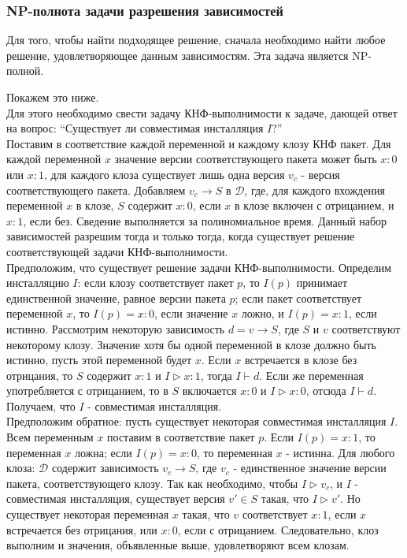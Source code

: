 \subsubsection{NP-полнота задачи разрешения зависимостей}
Для того, чтобы найти подходящее решение, сначала необходимо найти любое
решение, удовлетворяющее данным зависимостям. Эта задача является NP-полной.

Покажем это ниже.\\

Для этого необходимо свести задачу КНФ-выполнимости к задаче, дающей ответ на 
вопрос: ``Существует ли совместимая инсталляция $I$?''\\

Поставим в соответствие каждой переменной и каждому клозу КНФ пакет. Для
каждой переменной $x$ значение версии соответствующего пакета может быть
$x:0$ или $x:1$, для каждого клоза существует лишь одна версия $v_c$ - 
версия соответствующего пакета. Добавляем $v_c \to S$ в $\mathcal{D}$, где,
для каждого вхождения переменной $x$ в клозе, $S$ содержит $x:0$, если
$x$ в клозе включен с отрицанием, и $x:1$, если без. Сведение выполняется за
полиномиальное время. Данный набор зависимостей разрешим тогда и только тогда,
когда существует решение соответствующей задачи КНФ-выполнимости.\\

Предположим, что существует решение задачи КНФ-выполнимости. Определим инсталляцию 
$I$: если клозу соответствует пакет $p$, то $I(p)$ принимает единственной значение, 
равное версии пакета $p$; если пакет соответствует переменной $x$, то $I(p) = x:0$,
если значение $x$ ложно, и $I(p) = x:1$, если истинно. Рассмотрим некоторую зависимость
$d = v \to S$, где $S$ и $v$ соответствуют некоторому клозу. Значение хотя бы одной
переменной в клозе должно быть истинно, пусть этой переменной будет $x$. Если $x$ 
встречается в клозе без отрицания, то $S$ содержит $x:1$ и $I \rhd x:1$, тогда $I \vdash d$.
Если же переменная употребляется с отрицанием, то в $S$ включается $x:0$ и $I \rhd x:0$, отсюда 
$I \vdash d$. Получаем, что  $I$ - совместимая инсталляция.\\

Предположим обратное: пусть существует некоторая совместимая инсталляция $I$. Всем переменным 
$x$ поставим в соответствие пакет $p$. Если $I(p) = x:1$, то переменная $x$ ложна; если 
$I(p) = x:0$, то переменная $x$ - истинна. Для любого клоза: $\mathcal{D}$ содержит зависимость
$v_c \to S$, где $v_c$ - единственное значение версии пакета, соответствующего клозу. Так как 
необходимо, чтобы $I \rhd v_c$, и $I$ - совместимая инсталляция, существует версия $v' \in S$
такая, что $I \rhd v'$. Но существует  некоторая переменная $x$ такая, что $v$ соответствует 
$x:1$, если $x$ встречается без отрицания, или $x:0$, если с отрицанием. Следовательно, клоз 
выполним и значения, объявленные выше, удовлетворяют всем клозам.

